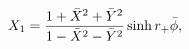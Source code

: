 \begin{equation}
X_1 = {1+\bar X^2+\bar Y^2 \over 1-\bar X^2-\bar Y^2} \sinh r_+
\bar\phi,
\end{equation}

